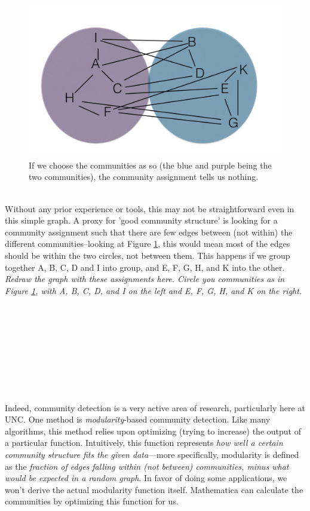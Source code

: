 \documentclass[12pt]{article}
\begin{document}
\begin{figure}[htbp]
\begin{center}
\includegraphics[width=.8\linewidth]{badcommunities}
\caption{If we choose the communities as so (the blue and purple being the two communities), the community assignment tells us nothing.}
\label{badcomm}
\end{center}
\end{figure}
\\
Without any prior experience or tools, this may not be straightforward even in this simple graph. A proxy for 'good community structure' is looking for a community assignment such that there are few edges between (not within) the different communities--looking at Figure \ref{badcomm}, this would mean most of the edges should be within the two circles, not between them. This happens if we group together A, B, C, D and I into group, and E, F, G, H, and K into the other.\\
\emph{Redraw the graph with these assignments here. Circle you communities as in Figure \ref{badcomm}, with A, B, C, D, and I on the left and E, F, G, H, and K on the right.}
\\
\\
\\
\\
\\
\\
\\
\\
\\
\\
Indeed, community detection is a very active area of research, particularly here at UNC. One method is \emph{modularity}-based community detection. Like many algorithms, this method relies upon optimizing (trying to increase) the output of a particular function. Intuitively, this function represents \emph{how well a certain community structure fits the given data}---more specifically, modularity is defined as the \emph{fraction of edges falling within (not between) communities, minus what would be expected in a random graph}.  In favor of doing some applications, we won't derive the actual modularity function itself. Mathematica can calculate the communities by optimizing this function for us.\\
\end{document}

